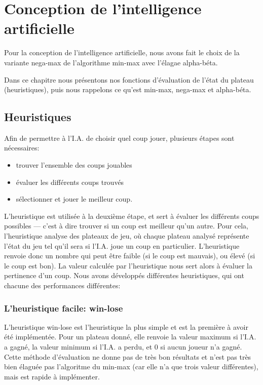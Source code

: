 \chapter{Conception de l'intelligence artificielle}\label{chapter:intelligence-artificielle}

Pour la conception de l'intelligence artificielle, nous avons fait le choix de la variante nega-max de l'algorithme min-max
avec l'élagae alpha-béta.

Dans ce chapitre nous présentons nos fonctions d'évaluation de l'état du plateau (heuristiques),
puis nous rappelons ce qu'est min-max, nega-max et alpha-béta.

\section{Heuristiques}

Afin de permettre à l'I.A. de choisir quel coup jouer, plusieurs étapes sont nécessaires:
\begin{itemize}
    \item trouver l'ensemble des coups jouables
    \item évaluer les différents coups trouvés
    \item sélectionner et jouer le meilleur coup.
\end{itemize}

L'heuristique est utilisée à la deuxième étape, et sert à évaluer les différents coups possibles
— c'est à dire trouver si un coup est meilleur qu'un autre. Pour cela, l'heuristique analyse des
plateaux de jeu, où chaque plateau analysé représente l'état du jeu tel qu'il sera si l'I.A. joue
un coup en particulier. L'heuristique renvoie donc un nombre qui peut être faible (si le coup est
mauvais), ou élevé (si le coup est bon). La valeur calculée par l'heuristique nous sert alors à
évaluer la pertinence d'un coup. Nous avons développés différentes heuristiques, qui ont chacune
des performances différentes:


\subsection{L'heuristique facile: win-lose}

L'heuristique win-lose est l'heuristique la plus simple et est la première à avoir été implémentée.
Pour un plateau donné, elle renvoie la valeur maximum si l'I.A. a gagné, la valeur minimum si
l'I.A. a perdu, et 0 si aucun joueur n'a gagné. Cette méthode d'évaluation ne donne pas de très bon
résultats et n'est pas très bien élaguée pas l'algoritme du min-max (car elle n'a que trois valeur
différentes), mais est rapide à implémenter.


